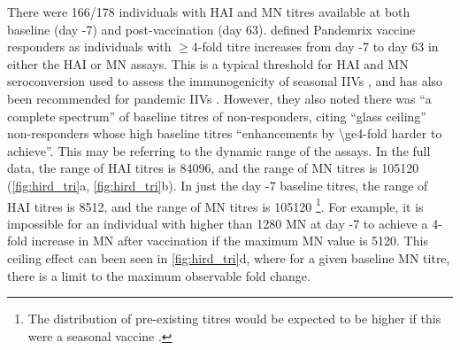 


There were 166/178 individuals with \gls{HAI} and \gls{MN} titres available at both baseline (day -7) and post-vaccination (day 63).
\textcite{sobolev2016AdjuvantedInfluenzaH1N1Vaccination} defined Pandemrix vaccine responders as individuals with $\ge$4-fold titre increases from day -7 to day 63 in either the \gls{HAI} or \gls{MN} assays.
This is a typical threshold for \gls{HAI} and \gls{MN} seroconversion used to assess the immunogenicity of seasonal \glspl{IIV} \autocite{krammer2019HumanAntibodyResponse}, 
and has also been recommended for pandemic \glspl{IIV} \autocite{foodanddrugadministration2007GuidanceIndustryClinical}.
However, they also noted there was \enquote{a complete spectrum} of baseline titres of non-responders, citing \enquote{glass ceiling} non-responders whose high baseline titres \enquote{enhancements by \num{\ge4}-fold harder to achieve}.
This may be referring to the dynamic range of the assays.
In the full data, the range of \gls{HAI} titres  is \num{8}{4096}, and the range of \gls{MN} titres is \num{10}{5120} (\cref{fig:hird_tri}a, \cref{fig:hird_tri}b).
In just the day -7 baseline titres, the range of \gls{HAI} titres is \num{8}{512}, and the range of \gls{MN} titres is \num{10}{5120}%
\footnote{
    The distribution of pre-existing titres would be expected to be higher if this were a seasonal vaccine \autocite{tsang2014GlobalAnalysesHuman}.
}.
For example, it is impossible for an individual with higher than 1280 \gls{MN} at day -7 to achieve a 4-fold increase in \gls{MN} after vaccination if the maximum \gls{MN} value is \num{5120}.
This ceiling effect can been seen in \cref{fig:hird_tri}d, where for a given baseline \gls{MN} titre, there is a limit to the maximum observable fold change.


